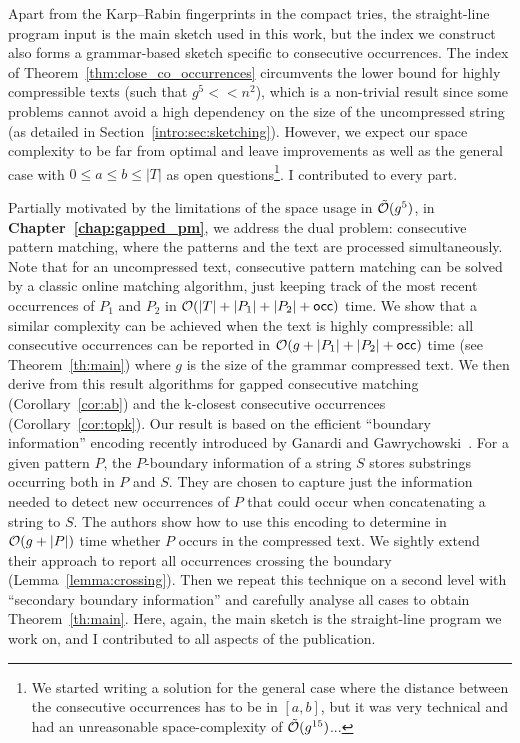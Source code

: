 Apart from the Karp--Rabin fingerprints in the compact tries, the straight-line program input is the main sketch used in this work, but the index we construct also forms a grammar-based sketch specific to consecutive occurrences.
The index of Theorem~\ref{thm:close_co_occurrences} circumvents the lower bound for highly compressible texts (such that $g^5 << n^2$), which is a non-trivial result since some problems cannot avoid a high dependency on the size of the uncompressed string (as detailed in Section~\ref{intro:sec:sketching}). However, we expect our space complexity to be far from optimal and leave improvements as well as the general case with $0 \leq a \leq b \leq |T|$ as open questions\footnote{We started writing a solution for the general case where the distance between the consecutive occurrences has to be in $[a,b]$, but it was very technical and had an unreasonable space-complexity of $\tilde {\mathcal{O}}(g^{15})$...}. I contributed to every part.


Partially motivated by the limitations of the space usage in $\tilde {\mathcal{O}}(g^5)$, in \textbf{Chapter~\ref{chap:gapped_pm}}, we address the dual problem: consecutive pattern matching, where the patterns and the text are processed simultaneously. Note that for an uncompressed text, consecutive pattern matching can be solved by a classic online matching algorithm, just keeping track of the most recent occurrences of $P_1$ and $P_2$ in $\mathcal{O}(|T|+|P_1|+|P_2|+\mathsf{occ})$ time.
We show that a similar complexity can be achieved when the text is highly compressible: all consecutive occurrences can be reported in $\mathcal{O}(g+|P_1|+|P_2|+\mathsf{occ})$ time (see Theorem~\ref{th:main}) where $g$ is the size of the grammar compressed text. We then derive from this result algorithms for gapped consecutive matching (Corollary~\ref{cor:ab}) and the k-closest consecutive occurrences (Corollary~\ref{cor:topk}).
Our result is based on the efficient ``boundary information'' encoding recently introduced by Ganardi and Gawrychowski~\cite{DBLP:conf/soda/GanardiG22}. For a given pattern $P$, the $P$-boundary information of a string $S$ stores substrings occurring both in $P$ and $S$. They are chosen to capture just the information needed to detect new occurrences of $P$ that could occur when concatenating a string to $S$. 
The authors show how to use this encoding to determine in $\mathcal{O}(g+|P|)$ time whether $P$ occurs in the compressed text. We sightly extend their approach to report all occurrences crossing the boundary (Lemma~\ref{lemma:crossing}). Then we repeat this technique on a second level with ``secondary boundary information'' and carefully analyse all cases to obtain Theorem~\ref{th:main}. Here, again, the main sketch is the straight-line program we work on, and I contributed to all aspects of the publication.


